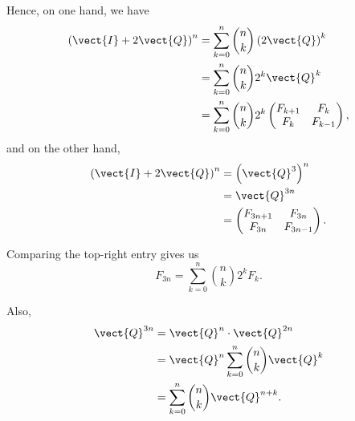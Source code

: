 \begin{enumerate}
\begin{enumerate}
                    Hence, on one hand, we have
                    \begin{align*}
                        \left(\vect{I} + 2 \vect{Q}\right)^n & = \sum_{k = 0}^{n} \binom{n}{k} \left(2\vect{Q}\right)^k              \\
                                                             & = \sum_{k = 0}^{n} \binom{n}{k} 2^k \vect{Q}^k                        \\
                                                             & = \sum_{k = 0}^{n} \binom{n}{k} 2^k \begin{pmatrix}
                                                                                                       F_{k + 1} & F_k \\ F_k & F_{k - 1}
                                                                                                   \end{pmatrix},
                    \end{align*}
                    and on the other hand,
                    \begin{align*}
                        \left(\vect{I} + 2 \vect{Q}\right)^n & = \left(\vect{Q}^3\right)^n                 \\
                                                             & = \vect{Q}^{3n}                             \\
                                                             & = \begin{pmatrix}
                                                                     F_{3n + 1} & F_{3n} \\ F_{3n} & F_{3n - 1}
                                                                 \end{pmatrix}.
                    \end{align*}

                    Comparing the top-right entry gives us
                    \[
                        F_{3n} = \sum_{k = 0}^{n} \binom{n}{k} 2^{k} F_k.
                    \]

                    Also,
                    \begin{align*}
                        \vect{Q}^{3n} & = \vect{Q}^n \cdot \vect{Q}^{2n}                          \\
                                      & = \vect{Q}^{n} \sum_{k = 0}^{n} \binom{n}{k} \vect{Q}^{k} \\
                                      & = \sum_{k = 0}^{n} \binom{n}{k} \vect{Q}^{n + k}.
                    \end{align*}


\end{enumerate}
\end{enumerate}
